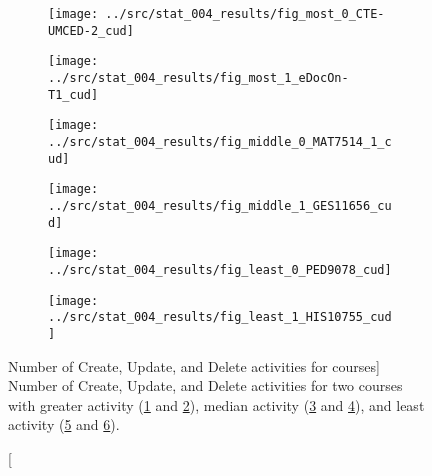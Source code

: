 \begin{figure}[h!]
    \centering

    \begin{subfigure}{.5\textwidth}
        \centering
        \texttt{[image: ../src/stat\_004\_results/fig\_most\_0\_CTE-UMCED-2\_cud]}
        \caption[]{}
        \label{subfig:stat_most_004_0_cud}
    \end{subfigure}%
    \begin{subfigure}{.5\textwidth}
        \centering
        \texttt{[image: ../src/stat\_004\_results/fig\_most\_1\_eDocOn-T1\_cud]}
        \caption[]{}
        \label{subfig:stat_most_004_1_cud}
    \end{subfigure}

    \begin{subfigure}{.5\textwidth}
        \centering
        \texttt{[image: ../src/stat\_004\_results/fig\_middle\_0\_MAT7514\_1\_cud]}
        \caption[]{}
        \label{subfig:stat_middle_004_0_cud}
    \end{subfigure}%
    \begin{subfigure}{.5\textwidth}
        \centering
        \texttt{[image: ../src/stat\_004\_results/fig\_middle\_1\_GES11656\_cud]}
        \caption[]{}
        \label{subfig:stat_middle_004_1_cud}
    \end{subfigure}

    \begin{subfigure}{.5\textwidth}
        \centering
        \texttt{[image: ../src/stat\_004\_results/fig\_least\_0\_PED9078\_cud]}
        \caption[]{}
        \label{subfig:stat_least_004_0_cud}
    \end{subfigure}%
    \begin{subfigure}{.5\textwidth}
        \centering
        \texttt{[image: ../src/stat\_004\_results/fig\_least\_1\_HIS10755\_cud]}
        \caption[]{}
        \label{subfig:stat_least_004_1_cud}
    \end{subfigure}

    \caption
        [Number of Create, Update, and Delete activities for courses]
        {Number of Create, Update, and Delete activities for two courses with
        greater activity (\ref{subfig:stat_most_004_0_cud} and
        \ref{subfig:stat_most_004_1_cud}), median activity
        (\ref{subfig:stat_middle_004_0_cud} and
        \ref{subfig:stat_middle_004_1_cud}), and least activity
        (\ref{subfig:stat_least_004_0_cud} and
        \ref{subfig:stat_least_004_1_cud}).}

    \label{fig:stat_004_cud}
\end{figure}

